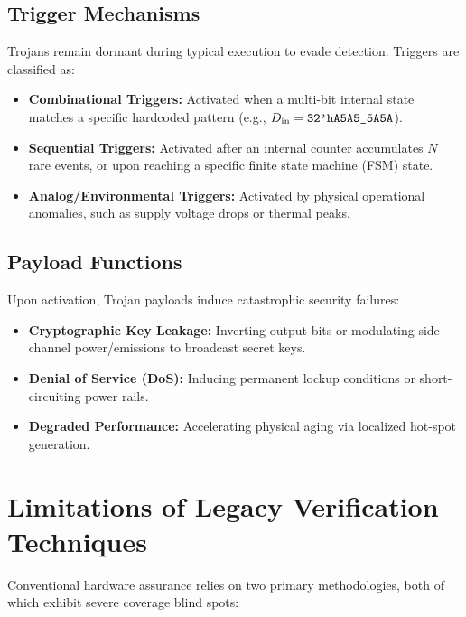 \documentclass[11pt,a4paper,oneside]{book}
\begin{document}
\subsection{Trigger Mechanisms}
Trojans remain dormant during typical execution to evade detection. Triggers are classified as:
\begin{itemize}[leftmargin=1.5em]
  \item \textbf{Combinational Triggers:} Activated when a multi-bit internal state matches a specific hardcoded pattern (e.g., $D_{\text{in}} = \text{\texttt{32'hA5A5\_5A5A}}$).
  \item \textbf{Sequential Triggers:} Activated after an internal counter accumulates $N$ rare events, or upon reaching a specific finite state machine (FSM) state.
  \item \textbf{Analog/Environmental Triggers:} Activated by physical operational anomalies, such as supply voltage drops or thermal peaks.
\end{itemize}

\subsection{Payload Functions}
Upon activation, Trojan payloads induce catastrophic security failures:
\begin{itemize}[leftmargin=1.5em]
  \item \textbf{Cryptographic Key Leakage:} Inverting output bits or modulating side-channel power/emissions to broadcast secret keys.
  \item \textbf{Denial of Service (DoS):} Inducing permanent lockup conditions or short-circuiting power rails.
  \item \textbf{Degraded Performance:} Accelerating physical aging via localized hot-spot generation.
\end{itemize}

\section{Limitations of Legacy Verification Techniques}

Conventional hardware assurance relies on two primary methodologies, both of which exhibit severe coverage blind spots:
\end{document}
